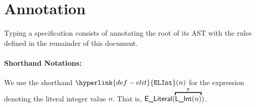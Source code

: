 \documentclass{book}
\newcommand\annotatestmt[1]{\hyperlink{def-annotatestmt}{\texttt{annotate\_stmt}}(#1)}
\newcommand\tenvone[0]{\texttt{tenv1}}
\newcommand\tenvtwo[0]{\texttt{tenv2}}
\newcommand\vs[0]{\texttt{s}}
\newcommand\vsone[0]{\texttt{s1}}
\newcommand\vstwo[0]{\texttt{s2}}
\newcommand\newsone[0]{\texttt{new\_s1}}
\newcommand\newstwo[0]{\texttt{new\_s2}}
\begin{document}

\section{Annotation}

Typing a specification consists of annotating the root of its AST with the rules defined
in the remainder of this document.


\paragraph{Shorthand Notations:}
\hypertarget{def-elit}{}
\newcommand\ELInt[1]{\hyperlink{def-elit}{\texttt{ELInt}}(#1)}
We use the shorthand $\ELInt{n}$ for the expression denoting the literal integer value $n$. That is, $\ELiteral(\overname{\lint(n)}{\vr})$.
\end{document}
